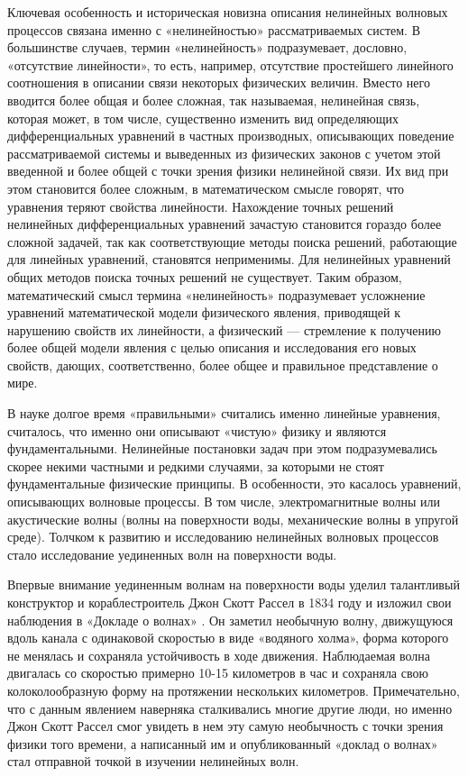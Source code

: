 
Ключевая особенность и историческая новизна описания нелинейных волновых процессов связана именно с «нелинейностью» рассматриваемых систем. В большинстве случаев, термин «нелинейность» подразумевает, дословно, «отсутствие линейности», то есть, например, отсутствие простейшего линейного соотношения в описании связи некоторых физических величин. Вместо него вводится более общая и более сложная, так называемая, нелинейная связь, которая может, в том числе, существенно изменить вид определяющих дифференциальных уравнений в частных производных, описывающих поведение рассматриваемой системы и выведенных из физических законов с учетом этой введенной и более общей с точки зрения физики нелинейной связи. Их вид при этом становится более сложным, в математическом смысле говорят, что уравнения теряют свойства линейности. Нахождение точных решений нелинейных дифференциальных уравнений зачастую становится гораздо более сложной задачей, так как соответствующие методы поиска решений, работающие для линейных уравнений, становятся неприменимы. Для нелинейных уравнений общих методов поиска точных решений не существует. Таким образом, математический смысл термина «нелинейность» подразумевает усложнение уравнений математической модели физического явления, приводящей к нарушению свойств их линейности, а физический --- стремление к получению более общей модели явления с целью описания и исследования его новых свойств, дающих, соответственно, более общее и правильное представление о мире.

В науке долгое время «правильными» считались именно линейные уравнения, считалось, что именно они описывают «чистую» физику и являются фундаментальными. Нелинейные постановки задач при этом подразумевались скорее некими частными и редкими случаями, за которыми не стоят фундаментальные физические принципы. В особенности, это касалось уравнений, описывающих волновые процессы. В том числе, электромагнитные волны или акустические волны (волны на поверхности воды, механические волны в упругой среде). Толчком к развитию и исследованию нелинейных волновых процессов стало исследование уединенных волн на поверхности воды.

Впервые внимание уединенным волнам на поверхности воды уделил талантливый конструктор и кораблестроитель Джон Скотт Рассел в 1834 году и изложил свои наблюдения в «Докладе о волнах» \cite{russell1845report}. Он заметил необычную волну, движущуюся вдоль канала с одинаковой скоростью в виде «водяного холма», форма которого не менялась и сохраняла устойчивость в ходе движения. Наблюдаемая волна двигалась со скоростью примерно 10-15 километров в час и сохраняла свою колоколообразную форму на протяжении нескольких километров. Примечательно, что с данным явлением наверняка сталкивались многие другие люди, но именно Джон Скотт Рассел смог увидеть в нем эту самую необычность с точки зрения физики того времени, а написанный им и опубликованный «доклад о волнах» стал отправной точкой в изучении нелинейных волн. 

